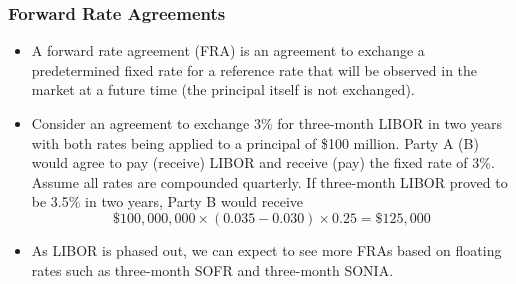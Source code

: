 \documentclass[10pt]{beamer}
\begin{document}
%
%
%
%		
%		
%


\begin{frame}
	\frametitle{Forward Rate Agreements}
	\begin{itemize} \itemsep15pt
		\item A forward rate agreement (FRA) is an agreement to exchange a predetermined fixed rate for a reference rate that will be observed in the market at a future time (the principal itself is not exchanged).
		\item Consider an agreement to exchange
		3\% for three-month LIBOR in two years with both rates being applied to a principal of \$100 million. Party A (B) would agree to pay (receive) LIBOR and receive (pay) the fixed rate of 3\%. Assume all rates are compounded quarterly. If three-month LIBOR proved to be 3.5\% in two years, Party B would receive
		$$
		\$100,000,000 \times (0.035 - 0.030) \times 0.25 = \$125,000
		$$
		
		\item As LIBOR is phased out, we can expect to see more FRAs based on floating rates such as three-month SOFR and three-month SONIA.
	\end{itemize}
\end{frame}
\end{document}
